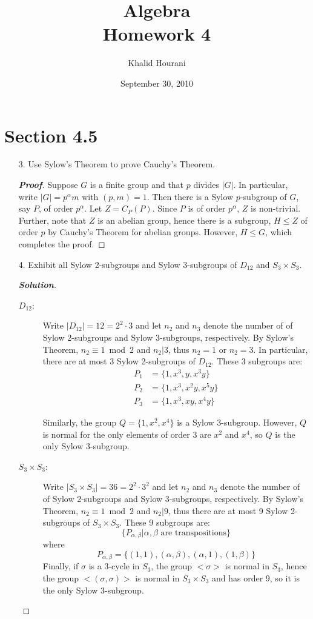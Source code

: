 \documentclass[12pt,leqno]{book}
\title{Algebra\\\large Homework 4}
\date{September 30, 2010}
\author{Khalid Hourani}
\theoremstyle{definition}
\newenvironment{Proof}{\begin{proof}[\textnormal{\textbf{Proof}}]}{\end{proof}}
\newenvironment{Solution}{\begin{proof}[\textnormal{\textbf{Solution}}]}{\end{proof}}
\begin{document}
 \begin{titlepage}
  \maketitle
 \end{titlepage}
\section*{Section 4.5}
\begin{enumerate}
 \item [3.] Use Sylow's Theorem to prove Cauchy's Theorem.
\begin{Proof}
 Suppose $G$ is a finite group and that $p$ divides $|G|$. In particular, write $|G|=p^{\alpha}m$ with $(p,m)=1$. Then there is a Sylow $p$-subgroup of $G$, say $P$, of order $p^{\alpha}$. Let $Z=C_P(P)$. Since $P$ is of order $p^{\alpha}$, $Z$ is non-trivial. Further, note that $Z$ is an abelian group, hence there is a subgroup, $H\leq Z$ of order $p$ by Cauchy's Theorem for abelian groups. However, $H\leq G$, which completes the proof.
\end{Proof}

 \item [4.] Exhibit all Sylow 2-subgroups and Sylow 3-subgroups of $D_{12}$ and $S_3\times S_3$. 
\begin{Solution}\indent
\begin{description}
 \item [$D_{12}$:]  Write $|D_{12}|=12=2^2\cdot3$ and let $n_2$ and $n_3$ denote the number of of Sylow 2-subgroups and Sylow 3-subgroups, respectively. By Sylow's Theorem, $n_2\equiv1\bmod{2}$ and $n_2|3$, thus $n_2=1$ or $n_2=3$. In particular, there are at most 3 Sylow 2-subgroups of $D_{12}$. These 3 subgroups are: 
\begin{align*}P_1&=\{1,x^3,y,x^3y\}\\P_2&=\{1,x^3,x^2y,x^5y\}\\P_3&=\{1,x^3,xy,x^4y\}\end{align*}

Similarly, the group $Q=\{1,x^2,x^4\}$ is a Sylow 3-subgroup. However, $Q$ is normal for the only elements of order 3 are $x^2$ and $x^4$, so $Q$ is the only Sylow 3-subgroup. 
 \item [$S_3\times S_3$:] Write $|S_3\times S_3|=36=2^2\cdot3^2$ and let $n_2$ and $n_3$ denote the number of of Sylow 2-subgroups and Sylow 3-subgroups, respectively. By Sylow's Theorem, $n_2\equiv1\bmod{2}$ and $n_2|9$, thus there are at most 9 Sylow 2-subgroups of $S_3\times S_3$. These 9 subgroups are: \[\{P_{\alpha,\beta}|\alpha,\beta\text{ are transpositions}\}\] where \[P_{\alpha,\beta}=\{(1,1),(\alpha,\beta),(\alpha,1),(1,\beta)\}\] Finally, if $\sigma$ is a 3-cycle in $S_3$, the group $<\sigma>$ is normal in $S_3$, hence the group $<(\sigma,\sigma)>$ is normal in $S_3\times S_3$ and has order 9, so it is the only Sylow 3-subgroup.
\end{description}
\end{Solution}


\end{enumerate}
\end{document}
